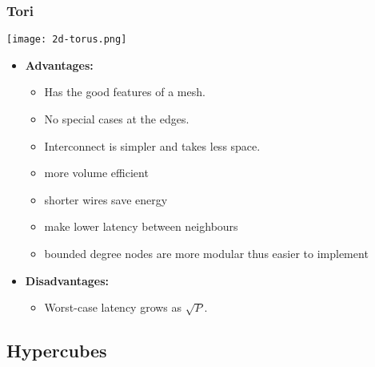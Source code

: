 \documentclass[../main.tex]{subfiles}
\begin{document}
\subsubsection{Tori}

	\begin{center}
		\texttt{[image: 2d-torus.png]}
	\end{center}
\begin{multicols}{2}
	\begin{itemize}
		\item \textbf{Advantages:}
		      \begin{itemize}
			      \item Has the good features of a mesh.
			      \item No special cases at the edges.
			      \item Interconnect is simpler and takes less space.
			      \item more volume efficient
			      \item shorter wires save energy
			      \item make lower latency between neighbours
			      \item bounded degree nodes are more modular thus easier to implement
		      \end{itemize}
		      	\end{itemize}

		      	\begin{itemize}

		\item \textbf{Disadvantages:}
		      \begin{itemize}
			      \item Worst-case latency grows as \(\sqrt{P}\).
		      \end{itemize}
	\end{itemize}
\end{multicols}



\subsection{Hypercubes}
\end{document}
